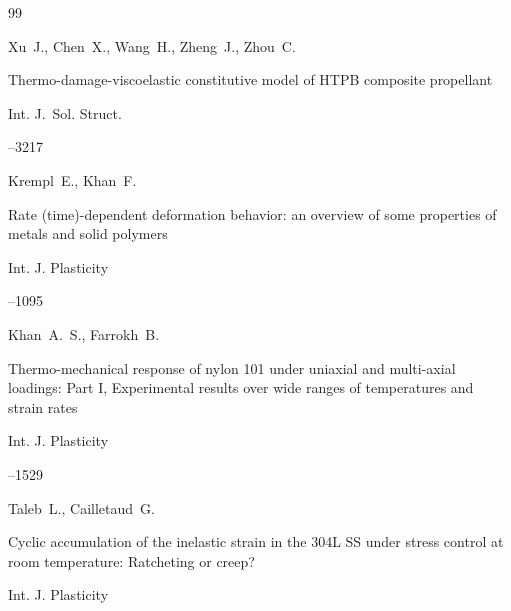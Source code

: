 \begin{thebibliography}{99}

\by Xu~J., Chen~X., Wang~H., Zheng~J., Zhou~C.

\paper Thermo-damage-viscoelastic constitutive model of HTPB composite propellant 

\jour Int. J.~Sol. Struct.




--3217







\by Krempl~E., Khan~F.

\paper Rate (time)-dependent deformation behavior: an overview of some properties of metals and solid polymers 

\jour Int. J. Plasticity




--1095







\by Khan~A.~S., Farrokh~B.

\paper Thermo-mechanical response of nylon 101 under uniaxial and multi-axial loadings: Part I, Experimental results over wide ranges of temperatures and strain rates

\jour Int. J. Plasticity




--1529







\by Taleb~L., Cailletaud~G. 

\paper Cyclic accumulation of the inelastic strain in the 304L SS under stress control at room temperature: Ratcheting or creep? 

\jour Int. J. Plasticity



\end{thebibliography}
